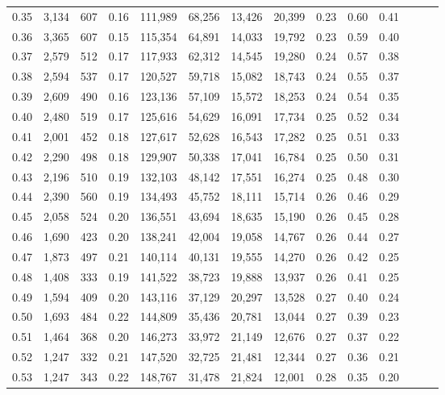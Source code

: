 \begin{tabular}{rrrrrrrrrrrrrr}
0.35 &  3,134 &  607 &  0.16 &  111,989 &   68,256 &  13,426 &  20,399 &  0.23 &  0.60 &      0.41 \\
0.36 &  3,365 &  607 &  0.15 &  115,354 &   64,891 &  14,033 &  19,792 &  0.23 &  0.59 &      0.40 \\
0.37 &  2,579 &  512 &  0.17 &  117,933 &   62,312 &  14,545 &  19,280 &  0.24 &  0.57 &      0.38 \\
0.38 &  2,594 &  537 &  0.17 &  120,527 &   59,718 &  15,082 &  18,743 &  0.24 &  0.55 &      0.37 \\
0.39 &  2,609 &  490 &  0.16 &  123,136 &   57,109 &  15,572 &  18,253 &  0.24 &  0.54 &      0.35 \\
0.40 &  2,480 &  519 &  0.17 &  125,616 &   54,629 &  16,091 &  17,734 &  0.25 &  0.52 &      0.34 \\
0.41 &  2,001 &  452 &  0.18 &  127,617 &   52,628 &  16,543 &  17,282 &  0.25 &  0.51 &      0.33 \\
0.42 &  2,290 &  498 &  0.18 &  129,907 &   50,338 &  17,041 &  16,784 &  0.25 &  0.50 &      0.31 \\
0.43 &  2,196 &  510 &  0.19 &  132,103 &   48,142 &  17,551 &  16,274 &  0.25 &  0.48 &      0.30 \\
0.44 &  2,390 &  560 &  0.19 &  134,493 &   45,752 &  18,111 &  15,714 &  0.26 &  0.46 &      0.29 \\
0.45 &  2,058 &  524 &  0.20 &  136,551 &   43,694 &  18,635 &  15,190 &  0.26 &  0.45 &      0.28 \\
0.46 &  1,690 &  423 &  0.20 &  138,241 &   42,004 &  19,058 &  14,767 &  0.26 &  0.44 &      0.27 \\
0.47 &  1,873 &  497 &  0.21 &  140,114 &   40,131 &  19,555 &  14,270 &  0.26 &  0.42 &      0.25 \\
0.48 &  1,408 &  333 &  0.19 &  141,522 &   38,723 &  19,888 &  13,937 &  0.26 &  0.41 &      0.25 \\
0.49 &  1,594 &  409 &  0.20 &  143,116 &   37,129 &  20,297 &  13,528 &  0.27 &  0.40 &      0.24 \\
0.50 &  1,693 &  484 &  0.22 &  144,809 &   35,436 &  20,781 &  13,044 &  0.27 &  0.39 &      0.23 \\
0.51 &  1,464 &  368 &  0.20 &  146,273 &   33,972 &  21,149 &  12,676 &  0.27 &  0.37 &      0.22 \\
0.52 &  1,247 &  332 &  0.21 &  147,520 &   32,725 &  21,481 &  12,344 &  0.27 &  0.36 &      0.21 \\
0.53 &  1,247 &  343 &  0.22 &  148,767 &   31,478 &  21,824 &  12,001 &  0.28 &  0.35 &      0.20 \\

\end{tabular}

